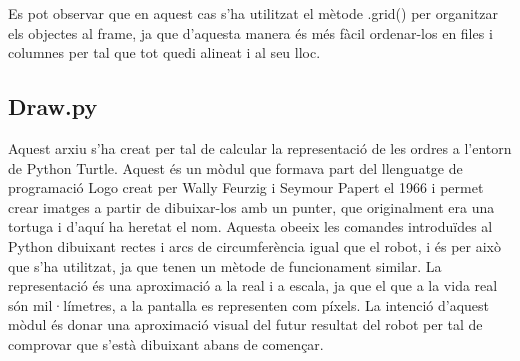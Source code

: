 Es pot observar que en aquest cas s’ha utilitzat el mètode .grid() per organitzar els objectes al frame, ja que d’aquesta manera és més fàcil ordenar-los en files i columnes per tal que tot quedi alineat i al seu lloc.

\subsection{Draw.py}

Aquest arxiu s’ha creat per tal de calcular la representació de les ordres a l’entorn de Python Turtle. Aquest és un mòdul que formava part del llenguatge de programació Logo creat per Wally Feurzig i Seymour Papert el 1966 i permet crear imatges a partir de dibuixar-los amb un punter, que originalment era una tortuga i d’aquí ha heretat el nom. Aquesta obeeix les comandes introduïdes al Python dibuixant rectes i arcs de circumferència igual que el robot, i és per això que s’ha utilitzat, ja que tenen un mètode de funcionament similar. La representació és una aproximació a la real i a escala, ja que el que a la vida real són mil·límetres, a la pantalla es representen com píxels. La intenció d’aquest mòdul és donar una aproximació visual del futur resultat del robot per tal de comprovar que s’està dibuixant abans de començar. 




  

